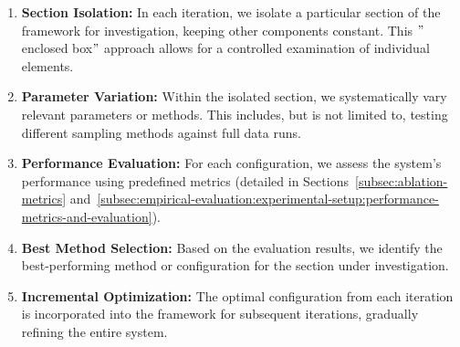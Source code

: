 \begin{enumerate}
    \item \textbf{Section Isolation:} In each iteration, we isolate a particular section of the framework for investigation, keeping other components constant.
    This \("\)enclosed box\("\) approach allows for a controlled examination of individual elements.
    \item \textbf{Parameter Variation:} Within the isolated section, we systematically vary relevant parameters or methods.
    This includes, but is not limited to, testing different sampling methods against full data runs.
    \item \textbf{Performance Evaluation:} For each configuration, we assess the system's performance using predefined metrics (detailed in Sections~\ref{subsec:ablation-metrics} and~\ref{subsec:empirical-evaluation:experimental-setup:performance-metrics-and-evaluation}).
    \item \textbf{Best Method Selection:} Based on the evaluation results, we identify the best-performing method or configuration for the section under investigation.
    \item \textbf{Incremental Optimization:} The optimal configuration from each iteration is incorporated into the framework for subsequent iterations, gradually refining the entire system.
\end{enumerate}

%
%


